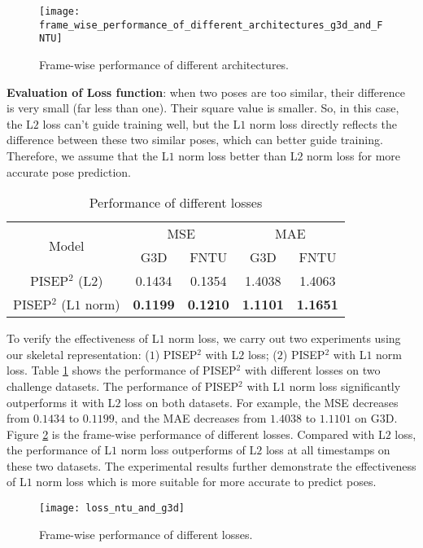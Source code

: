 \documentclass[journal]{IEEEtran}
\begin{document}
\begin{figure}[!t]
\centering
\texttt{[image: frame\_wise\_performance\_of\_different\_architectures\_g3d\_and\_FNTU]}
\caption{Frame-wise performance of different architectures.}
\label{fig10}
\end{figure}

{\bf Evaluation of Loss function}: when two poses are too similar, their difference is very small (far less than one). Their square value is smaller. So, in this case, the L${2}$ loss can't guide training well, but the L${1}$ norm loss directly reflects the difference between these two similar poses, which can better guide training. Therefore, we assume that the L${1}$ norm loss better than L${2}$ norm loss for more accurate pose prediction.

\begin{table}[!t]
\renewcommand{\arraystretch}{1.3}
\caption{Performance of different losses}
\label{table4}
\centering
\begin{tabular}{ccccc}
\hline
\multirow{2}{*}{Model}& \multicolumn{2}{c}{MSE} & \multicolumn{2}{c}{MAE} \\
 \cline{2-5}& G3D &FNTU & G3D &FNTU  \\
\hline
PISEP${^2}$ (L${2}$)&0.1434&0.1354&1.4038&1.4063 \\
PISEP${^2}$ (L${1}$ norm)&{\bf 0.1199}&{\bf 0.1210}&{\bf 1.1101}&{\bf 1.1651} \\
\hline
\end{tabular}
\end{table}

To verify the effectiveness of L${1}$ norm loss, we carry out two experiments using our skeletal representation: (${1}$) PISEP${^2}$ with L${2}$ loss; (${2}$) PISEP${^2}$ with L${1}$ norm loss. Table \ref{table4} shows the performance of PISEP${^2}$ with different losses on two challenge datasets. The performance of PISEP${^2}$ with L1 norm loss significantly outperforms it with L${2}$ loss on both datasets. For example, the MSE decreases from ${0.1434}$ to ${0.1199}$, and the MAE decreases from ${1.4038}$ to ${1.1101}$ on G${3}$D. Figure \ref{fig11} is the frame-wise performance of different losses. Compared with L${2}$ loss, the performance of L${1}$ norm loss outperforms of L${2}$ loss at all timestamps on these two datasets. The experimental results further demonstrate the effectiveness of L${1}$ norm loss which is more suitable for more accurate to predict poses.

\begin{figure}[!t]
\centering
\texttt{[image: loss\_ntu\_and\_g3d]}
\caption{Frame-wise performance of different losses.}
\label{fig11}
\end{figure}
\end{document}
